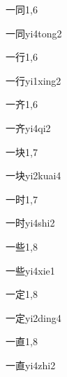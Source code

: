 \begin{entry}{一同}{1,6}
  \begin{phonetics}{一同}{yi4tong2}
  \end{phonetics}
\end{entry}

\begin{entry}{一行}{1,6}
  \begin{phonetics}{一行}{yi1xing2}
  \end{phonetics}
\end{entry}

\begin{entry}{一齐}{1,6}
  \begin{phonetics}{一齐}{yi4qi2}
  \end{phonetics}
\end{entry}

\begin{entry}{一块}{1,7}
  \begin{phonetics}{一块}{yi2kuai4}
  \end{phonetics}
\end{entry}

\begin{entry}{一时}{1,7}
  \begin{phonetics}{一时}{yi4shi2}
  \end{phonetics}
\end{entry}

\begin{entry}{一些}{1,8}
  \begin{phonetics}{一些}{yi4xie1}
  \end{phonetics}
\end{entry}

\begin{entry}{一定}{1,8}
  \begin{phonetics}{一定}{yi2ding4}
  \end{phonetics}
\end{entry}

\begin{entry}{一直}{1,8}
  \begin{phonetics}{一直}{yi4zhi2}
  \end{phonetics}
\end{entry}

